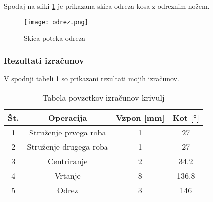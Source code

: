 Spodaj na sliki \ref{odrez} je prikazana skica odreza kosa z odreznim nožem.
\begin{figure}[H]
	\begin{center}
		\texttt{[image: odrez.png]}
		\caption{Skica poteka odreza
			\cite{lasten}}
		\label{odrez}
	\end{center}
\end{figure}

\subsubsection{Rezultati izračunov}
V spodnji tabeli \ref{Tabela rezultatov} so prikazani
rezultati mojih izračunov.

\begin{table}[H]
	\caption{Tabela povzetkov izračunov krivulj}
	\label{Tabela rezultatov}
	\begin{center}
		\begin{tabular}{|c|c|c|c|}
			\hline
			Št. & Operacija              & Vzpon [mm] & Kot [°] \\
			\hline
			1   & Struženje prvega roba  & 1          & 27      \\
			\hline
			2   & Struženje drugega roba & 1          & 27      \\
			\hline
			3   & Centriranje            & 2          & 34.2    \\
			\hline
			4   & Vrtanje                & 8          & 136.8   \\
			\hline
			5   & Odrez                  & 3          & 146     \\
			\hline
		\end{tabular}
	\end{center}
\end{table}

